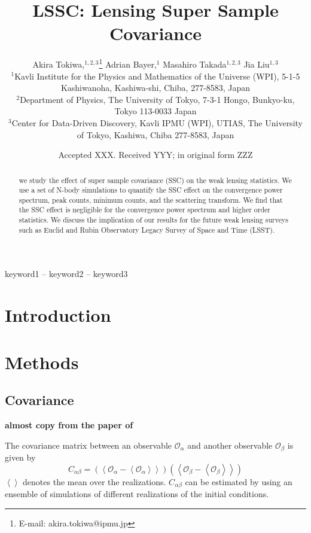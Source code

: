 \documentclass[fleqn,usenatbib]{mnras}
\title[Lensing Super Sample Covariance]{LSSC: Lensing Super Sample Covariance}
\author[A. Tokiwa et al.]{
Akira Tokiwa,$^{1, 2, 3}$\thanks{E-mail: akira.tokiwa@ipmu.jp}
Adrian Bayer,$^{1}$
Masahiro Takada$^{1, 2,3}$
Jia Liu$^{1, 3}$
\\
$^{1}$Kavli Institute for the Physics and Mathematics of the Universe (WPI), 5-1-5 Kashiwanoha, Kashiwa-shi, Chiba, 277-8583, Japan\\
$^{2}$Department of Physics, The University of Tokyo, 7-3-1 Hongo, Bunkyo-ku, Tokyo 113-0033 Japan\\
$^{3}$Center for Data-Driven Discovery, Kavli IPMU (WPI), UTIAS, The University of Tokyo, Kashiwa, Chiba 277-8583, Japan
}
\date{Accepted XXX. Received YYY; in original form ZZZ}
\begin{document}
\label{firstpage}
\pagerange{\pageref{firstpage}--\pageref{lastpage}}
\maketitle

\begin{abstract}
we study the effect of super sample covariance (SSC) on the weak lensing statistics. 
We use a set of N-body simulations to quantify the SSC effect on the convergence power spectrum, peak counts, minimum counts, and the scattering transform. 
We find that the SSC effect is negligible for the convergence power spectrum and higher order statistics.
We discuss the implication of our results for the future weak lensing surveys such as Euclid and Rubin Observatory Legacy Survey of Space and Time (LSST).
\end{abstract}

\begin{keywords}
keyword1 -- keyword2 -- keyword3
\end{keywords}



\section{Introduction}

\section{Methods}
\label{sec:method}

\subsection{Covariance}
\textbf{almost copy from the paper of \cite{PhysRevD.108.043521}}

The covariance matrix between an observable $\mathcal{O}_\alpha$ and another observable $\mathcal{O}_\beta$ is given by 
\begin{equation}
    C_{\alpha\beta} = \left(\left<\mathcal{O}_\alpha - \left<\mathcal{O}_\alpha\right>\right>\right)\left(\left<\mathcal{O}_\beta - \left<\mathcal{O}_\beta\right>\right>\right)
\end{equation}
$\left<\right>$ denotes the mean over the realizations. $C_{\alpha\beta}$ can be estimated by using an ensemble of simulations of different realizations of the initial conditions.
\end{document}
